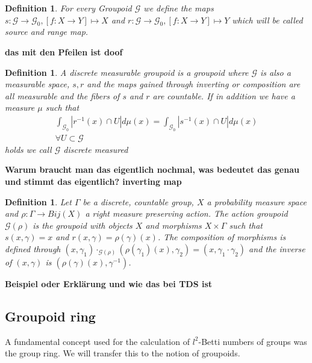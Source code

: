 \documentclass[12pt,a4paper]{scrartcl}
\newtheorem{Definition}[Theorem]{Definition}
\numberwithin{equation}{section}
\newcommand{\2}{\mathbb{Z} / 2 \mathbb{Z}}
\newcommand{\G}{\mathcal{G}}
\newcommand{\1}{\overline{1}}
\newcommand{\0}{\overline{0}}
\begin{document}
\begin{Definition}
	For every Groupoid $\mathcal{G}$ we define the maps $s: \mathcal{G} \to \mathcal{G}_0, [f:X \to Y] \mapsto X$ and $r: \mathcal{G} \to \mathcal{G}_0, [f:X \to Y] \mapsto Y$ which will be called source and range map.
\end{Definition}
\textbf{das mit den Pfeilen ist doof}
\begin{Definition}
	A discrete measurable groupoid is a groupoid where $\mathcal{G}$ is also a measurable space, $s, r$ and the maps gained through inverting or composition are all measurable and the fibers of $s$ and $r$ are countable.
	If in addition we have a measure $\mu$ such that 
	\begin{align*}
		\int_{\mathcal{G}_0} |r^{-1}(x) \cap U| d\mu(x) = \int_{\mathcal{G}_0} |s^{-1}(x) \cap U| d\mu(x) \\ \forall U \subset \mathcal{G}
	\end{align*}
	holds we call $\mathcal{G}$ discrete measured
\end{Definition}
\textbf{Warum braucht man das eigentlich nochmal, was bedeutet das genau und stimmt das eigentlich? inverting map}
\begin{Definition}
	Let $\Gamma$ be a discrete, countable group, $X$ a probability measure space and $\rho: \Gamma \to Bij(X)$ a right measure preserving action. The action groupoid $\G(\rho)$ is the groupoid with objects $X$ and morphisms $X \times \Gamma$ such that $s(x,\gamma) = x$ and $r(x, \gamma) = \rho(\gamma) (x)$. The composition of morphisms is defined through $(x, \gamma_1) \cdot_{\G(\rho)} (\rho(\gamma_1) (x), \gamma_2) = (x, \gamma_1 \cdot \gamma_2)$ and the inverse of $(x, \gamma)$ is $(\rho(\gamma) (x), \gamma^{-1})$.
\end{Definition}
\textbf{Beispiel oder Erklärung und wie das bei TDS ist}

\subsection{Groupoid ring}
A fundamental concept used for the calculation of $l^2$-Betti numbers of groups was the group ring. We will transfer this to the notion of groupoids.
\end{document}
